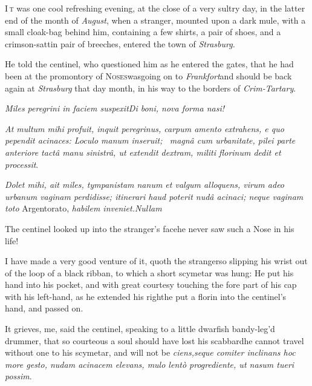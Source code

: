 \documentclass{article}
\begin{document}
\lettrine{I}{\,t} was one cool refreshing evening,
at the close of a very sultry day, in the latter end of the month
of \textit{August}, when a stranger, mounted upon a dark mule, with a
small cloak-bag behind him, containing a few shirts, a pair of
shoes, and a crimson-sattin pair of breeches, entered the town of
\textit{Strasburg.}

He told the centinel, who questioned him as he entered the
gates, that he had been at the promontory of
\textsc{Noses}\tsk was\break going on to
\textit{Frankfort}\tsh and should be back again at
\textit{Strasburg} that day month, in his way to the borders of
\textit{Crim-\break Tartary}.

\pagestyle{fancy}
\textit{Miles peregrini in faciem suspexit\tsh Di boni, nova
forma nasi!}

\vspace{20pt}

\textit{At multum mihi profuit, inquit peregrinus, carpum amento
extrahens, e quo pependit acinaces: Loculo manum inse\-ruit; \et\ magnâ cum
urbanitate, pilei parte anteriore tactâ manu sinistrâ,
ut extendit dextram, militi florinum dedit et processit}.

\vspace{40pt}

\textit{Dolet mihi, ait miles, tympanistam na\-num et valgum alloquens,
virum adeo urbanum vaginam perdidisse; itinerari haud poterit
nudâ acinaci; neque vaginam toto} Argentorato, \textit{habilem
inveniet.\tsh Nullam 
}

The centinel looked up into the stran\-ger’s
face\tsh he never saw such a Nose in his life!


\tsk I have made a very good venture of it, quoth the
stranger\tsk so slipping his wrist out of the loop of a black
ribban, to which a short scymetar was hung: He put his hand
into his pocket, and with great courtesy touching the fore part of
his cap with his left-hand, as he extended his
right\tsk he put a florin into the centinel’s hand,
and passed on.

It grieves, me, said the centinel, speaking to a little dwarfish
bandy-leg’d drummer, that so courteous a soul should have
lost his scabbard\tsk he cannot travel without one to his
scymetar, and will not be\break
{}
\textit{ciens,\tsk seque comiter inclinans \tsk hoc more
gesto, nudam acinacem elevans, mulo lentò progrediente, ut
nasum tueri possim}.
\end{document}
